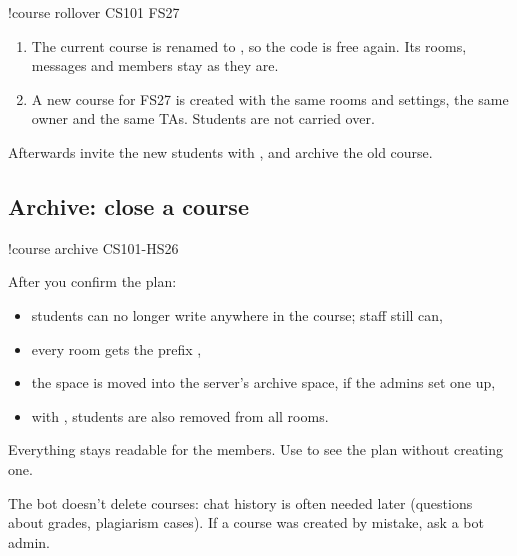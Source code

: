 \begin{you}
!course rollover CS101 FS27
\end{you}

\begin{enumerate}
  \item The current course is renamed to , so the code  is free
        again. Its rooms, messages and members stay as they are.
  \item A new course  for FS27 is created with the same rooms and settings, the same
        owner and the same TAs. Students are not carried over.
\end{enumerate}

Afterwards invite the new students with , and archive the old course.

\subsection*{Archive: close a course}

\begin{you}
!course archive CS101-HS26
\end{you}

After you confirm the plan:

\begin{itemize}
  \item students can no longer write anywhere in the course; staff still can,
  \item every room gets the prefix \cmd{[Archiv HS26]},
  \item the space is moved into the server's archive space, if the admins set one up,
  \item with , students are also removed from all rooms.
\end{itemize}

Everything stays readable for the members. Use  to see the plan without
creating one.

\begin{note}
The bot doesn't delete courses: chat history is often needed later (questions about grades,
plagiarism cases). If a course was created by mistake, ask a bot admin.
\end{note}
